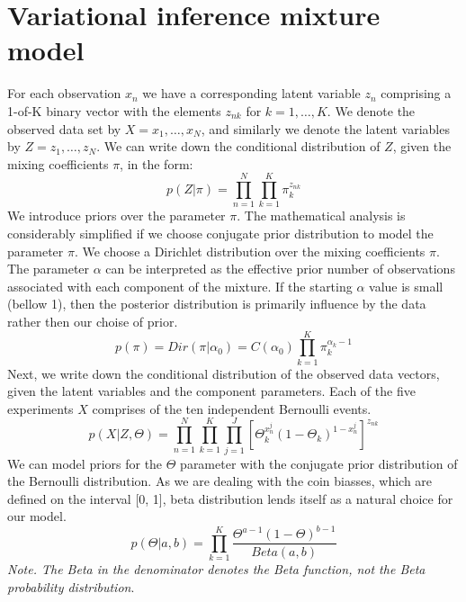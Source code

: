 \documentclass{article}
\newcommand\ProbSingleCoin{\Theta_k^{x_n^j}(1-\Theta_k)^{1-x_n^j}}
\newcommand\ProdK{\prod_{k=1}^{K}}
\newcommand\ProdN{\prod_{n=1}^{N}}
\newcommand\ProdJ{\prod_{j=1}^{J}}
\begin{document}
\section{Variational inference mixture model}
For each observation $x_n$ we have a corresponding latent variable $z_n$ comprising a 1-of-K binary vector with the elements $z_{nk}$ for $k = 1, \dots, K$. We denote the observed data set by $X = {x_1, \dots, x_N}$, and similarly we denote the latent variables by $Z={z_1, \dots, z_N}$. We can write down the conditional distribution of $Z$, given the mixing coefficients $\pi$, in the form:
\begin{equation}
    p(Z|\pi) = \ProdN \ProdK \pi_k^{z_{nk}}
\end{equation}
We introduce priors over the parameter $\pi$. The mathematical analysis is considerably simplified if we choose conjugate prior distribution to model the parameter $\pi$. We choose a Dirichlet distribution over the mixing coefficients $\pi$. The parameter $\alpha$ can be interpreted as the effective prior number of observations associated with each component of the mixture. If the starting $\alpha$ value is small (bellow 1), then the posterior distribution is primarily influence by the data rather then our choise of prior.
\begin{equation}
    p(\pi) = Dir(\pi|\alpha_0) = C(\alpha_0)\ProdK{}\pi_k^{\alpha_k-1}
\end{equation}
Next, we write down the conditional distribution of the observed data vectors, given the latent variables and the component parameters. Each of the five experiments $X$ comprises of the ten independent Bernoulli events.
\begin{equation}
    p(X|Z,\Theta)= \ProdN\ProdK\ProdJ[\ProbSingleCoin{}]^{z_{nk}}
\end{equation}
We can model priors for the $\Theta$ parameter with the conjugate prior distribution of the Bernoulli distribution. As we are dealing with the coin biasses, which are defined on the interval [0, 1], beta distribution lends itself as a natural choice for our model.
\begin{equation}
    p(\Theta|a,b) = \ProdK\frac{\Theta^{a-1}(1-\Theta)^{b-1}}{Beta(a,b)}
\end{equation}
\textit{Note. The Beta in the denominator denotes the Beta function, not the Beta probability distribution}.
\end{document}

